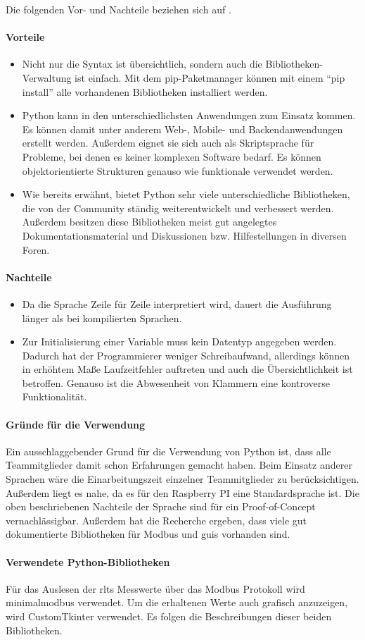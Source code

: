 Die folgenden Vor- und Nachteile beziehen sich auf \textcite{Ceaseo:2020}.
\paragraph{Vorteile}
\begin{itemize}
	\item Nicht nur die Syntax ist übersichtlich, sondern auch die Bibliotheken-Verwaltung ist einfach. Mit dem pip-Paketmanager können mit einem \enquote{pip install} alle vorhandenen Bibliotheken installiert werden.
	\item Python kann in den unterschiedlichsten Anwendungen zum Einsatz kommen. Es können damit unter anderem Web-, Mobile- und Backendanwendungen erstellt werden. Außerdem eignet sie sich auch als Skriptsprache für Probleme, bei denen es keiner komplexen Software bedarf. Es können objektorientierte Strukturen genauso wie funktionale verwendet werden. 
	\item Wie bereits erwähnt, bietet Python sehr viele unterschiedliche Bibliotheken, die von der Community ständig weiterentwickelt und verbessert werden. Außerdem besitzen diese Bibliotheken meist gut angelegtes Dokumentationsmaterial und Diskussionen bzw. Hilfestellungen in diversen Foren.
\end{itemize}

\paragraph{Nachteile}
\begin{itemize}{}{}
	\item Da die Sprache Zeile für Zeile interpretiert wird, dauert die Ausführung länger als bei kompilierten Sprachen.
	\item Zur Initialisierung einer Variable muss kein Datentyp angegeben werden. Dadurch hat der Programmierer weniger Schreibaufwand, allerdings können in erhöhtem Maße Laufzeitfehler auftreten und auch die Übersichtlichkeit ist betroffen. Genauso ist die Abwesenheit von Klammern eine kontroverse Funktionalität.
\end{itemize}

\paragraph{Gründe für die Verwendung}
Ein ausschlaggebender Grund für die Verwendung von Python ist, dass alle Teammitglieder damit schon Erfahrungen gemacht haben. Beim Einsatz anderer Sprachen wäre die Einarbeitungszeit einzelner Teammitglieder zu berücksichtigen. Außerdem liegt es nahe, da es für den Raspberry PI eine Standardsprache ist. Die oben beschriebenen Nachteile der Sprache sind für ein Proof-of-Concept vernachlässigbar. Außerdem hat die Recherche ergeben, dass viele gut dokumentierte Bibliotheken für Modbus und \aclp{gui} vorhanden sind.

\paragraph{Verwendete Python-Bibliotheken}
Für das Auslesen der \acfp{rlt} Messwerte über das Modbus Protokoll wird minimalmodbus verwendet. Um die erhaltenen Werte auch grafisch anzuzeigen, wird CustomTkinter verwendet. Es folgen die Beschreibungen dieser beiden Bibliotheken.

